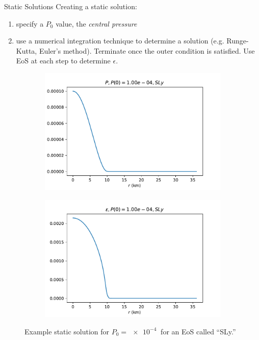 \documentclass[handout]{beamer}
\begin{document}
    \begin{frame}{Static Solutions}
        \pause
        Creating a static solution:\pause
        \begin{enumerate}
            \item specify a $P_0$ value, the \textit{central pressure}\pause
            \item use a numerical integration technique to determine a solution \pause (e.g. Runge-Kutta, Euler's method). \pause Terminate once the outer condition is satisfied. \pause Use EoS at each step to determine $\epsilon$. \pause
        \end{enumerate}

        \begin{figure}[h!]
            \centering
            \begin{subfigure}{.5\textwidth}
                \includegraphics[width = \textwidth]{../paper/images/tov/SLy_P,p00.0001.pdf}
            \end{subfigure}%
            \begin{subfigure}{.5\textwidth}
                \includegraphics[width = \textwidth]{../paper/images/tov/SLy_rho,p00.0001.pdf}
            \end{subfigure}
            \caption[]{Example static solution for $P_0 = \SI{e-4}{}$ for an EoS called ``SLy.''}
        \end{figure}
    \end{frame}
\end{document}
